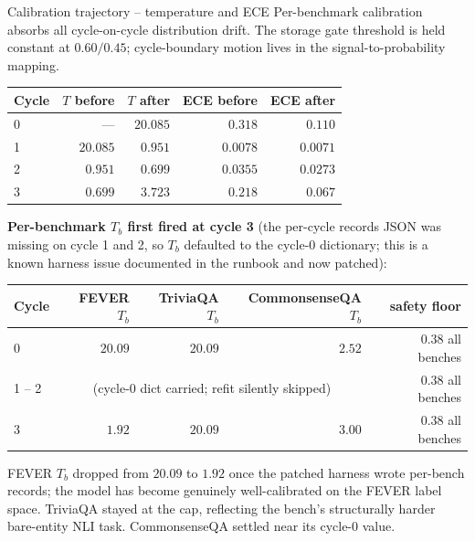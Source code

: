 \documentclass[10pt,aspectratio=169]{beamer}
\begin{document}
\begin{frame}{Calibration trajectory -- temperature and ECE}
  \scriptsize
  Per-benchmark calibration absorbs all cycle-on-cycle distribution drift. The storage gate threshold is held constant at $0.60/0.45$; cycle-boundary motion lives in the signal-to-probability mapping.

  \vspace{0.3em}
  \begin{tabular}{@{}lrrrr@{}}
    \toprule
    \textbf{Cycle} & \textbf{$T$ before} & \textbf{$T$ after} & \textbf{ECE before} & \textbf{ECE after} \\
    \midrule
    0 & --- & $20.085$ & $0.318$ & $0.110$ \\
    1 & $20.085$ & $0.951$ & $0.0078$ & $0.0071$ \\
    2 & $0.951$ & $0.699$ & $0.0355$ & $0.0273$ \\
    3 & $0.699$ & $\mathbf{3.723}$ & $\mathbf{0.218}$ & $0.067$ \\
    \bottomrule
  \end{tabular}

  \vspace{0.3em}
  \textbf{Per-benchmark $T_b$ first fired at cycle 3} (the per-cycle records JSON was missing on cycle 1 and 2, so $T_b$ defaulted to the cycle-0 dictionary; this is a known harness issue documented in the runbook and now patched):

  \vspace{0.2em}
  \begin{tabular}{@{}lrrrr@{}}
    \toprule
    \textbf{Cycle} & \textbf{FEVER $T_b$} & \textbf{TriviaQA $T_b$} & \textbf{CommonsenseQA $T_b$} & \textbf{safety floor} \\
    \midrule
    0 & $20.09$ & $20.09$ & $2.52$ & $0.38$ all benches \\
    1 -- 2 & \multicolumn{3}{c}{(cycle-0 dict carried; refit silently skipped)} & $0.38$ all benches \\
    3 & $\mathbf{1.92}$ & $20.09$ & $3.00$ & $0.38$ all benches \\
    \bottomrule
  \end{tabular}

  \vspace{0.3em}
  {\scriptsize FEVER $T_b$ dropped from $20.09$ to $1.92$ once the patched harness wrote per-bench records; the model has become genuinely well-calibrated on the FEVER label space. TriviaQA stayed at the cap, reflecting the bench's structurally harder bare-entity NLI task. CommonsenseQA settled near its cycle-0 value.}
\end{frame}
\end{document}
